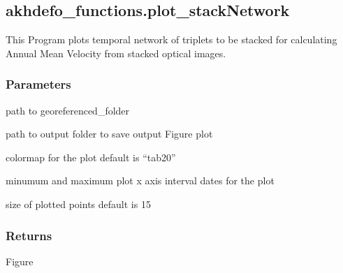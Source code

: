 \documentclass[letterpaper,10pt]{sphinxmanual}
\begin{document}
\sphinxstepscope


\subsection{akhdefo\_functions.plot\_stackNetwork}
\label{\detokenize{generated/akhdefo_functions.plot_stackNetwork:akhdefo-functions-plot-stacknetwork}}\label{\detokenize{generated/akhdefo_functions.plot_stackNetwork::doc}}

\begin{fulllineitems}
\label{\detokenize{generated/akhdefo_functions.plot_stackNetwork:akhdefo_functions.plot_stackNetwork}}
\pysigstartsignatures
{}
\pysigstopsignatures
\sphinxAtStartPar
This Program plots temporal network of triplets to be stacked for calculating 
Annual Mean Velocity from stacked optical images.


\subsubsection{Parameters}
\label{\detokenize{generated/akhdefo_functions.plot_stackNetwork:parameters}}\begin{description}
\sphinxAtStartPar
path to georeferenced\_folder

\sphinxAtStartPar
path to output folder to save output Figure plot

\sphinxAtStartPar
colormap for the plot default is “tab20”

\sphinxAtStartPar
minumum and maximum plot x axis interval dates for the plot

\sphinxAtStartPar
size of plotted points default is 15

\end{description}


\subsubsection{Returns}
\label{\detokenize{generated/akhdefo_functions.plot_stackNetwork:returns}}
\sphinxAtStartPar
Figure

\end{fulllineitems}
\end{document}
